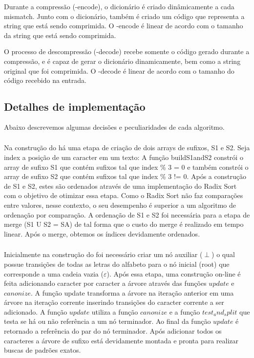 Durante a compressão (\lz-encode), o dicionário é criado dinâmicamente a cada
mismatch. Junto com o dicionário, também é criado um código que representa a
string que está sendo comprimida. O \lz-encode é linear de acordo
com o tamanho da string que está sendo comprimida.

O processo de descompressão (\lz-decode) recebe somente o código gerado durante
a compressão, e é capaz de gerar o dicionário dinamicamente, bem como a string
original que foi comprimida. O \lz-decode é linear de acordo com o tamanho do
código recebido na entrada.


\subsection{Detalhes de implementação}
Abaixo descrevemos algumas decisões e peculiaridades de cada algoritmo.

\subsubsection{\lsa}

Na construção do \lsa há uma etapa de criação de dois arrays de sufixos, S1 e S2.
Seja index a posição de um caracter em um texto:  A função buildS1andS2 constrói
o array de sufixo S1 que contém sufixos tal que index \% 3 = 0 e também constrói
o array de sufixo S2 que contém sufixos tal que index \% 3 != 0. Após a
construção de S1 e S2, estes são ordenados através de uma implementação do Radix
Sort com o objetivo de otimizar essa etapa. Como o Radix Sort não faz
comparações entre valores, nesse contexto, o seu desempenho é superior a um
algoritmo de ordenação por comparação. A ordenação de S1 e S2 foi necessária
para a etapa de merge (S1  U  S2 = SA)  de tal forma que o custo do merge é
realizado em tempo linear. Após o merge, obtemos os índices devidamente
ordenados.

\subsubsection{\lst}
Inicialmente na construção do \lst foi necessário criar um nó auxiliar ($\perp$) o qual possue transições de todas as letras do alfabeto para o nó inicial (root) que corresponde a uma cadeia vazia ($\varepsilon$). Após essa etapa, uma construção on-line é feita adicionando caracter por caracter a árvore através das funções $update$ e $canonize$. A função update transforma a árvore na iteração anterior em uma árvore na iteração corrente inserindo transições do caracter corrente a ser adicionado. A função $update$ utiliza a função $canonize$ e a função $test_and_split$ que testa se há ou não referência a um nó terminador. Ao final da função $update$ é retornado a referência do par do nó terminador. Após adicionar todos os caracteres a árvore de sufixo está devidamente montada e pronta para realizar buscas de padrões exatos.

